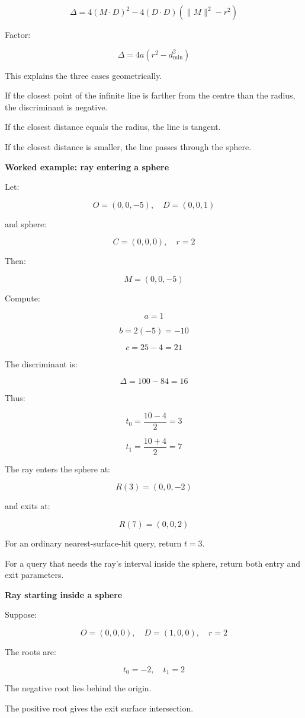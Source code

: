 \[
\Delta= 4(M\cdot D)^2 - 4(D\cdot D)(\|M\|^2-r^2)
\]

Factor:

\[
\boxed{ \Delta=4a(r^2-d_{\min}^2) }
\]

This explains the three cases geometrically.

If the closest point of the infinite line is farther from the centre than the radius, the discriminant is negative.

If the closest distance equals the radius, the line is tangent.

If the closest distance is smaller, the line passes through the sphere.

\textbf{Worked example: ray entering a sphere}

Let:

\[
O=(0,0,-5),\quad D=(0,0,1)
\]

and sphere:

\[
C=(0,0,0),\quad r=2
\]

Then:

\[
M=(0,0,-5)
\]

Compute:

\[
a=1
\]

\[
b=2(-5)=-10
\]

\[
c=25-4=21
\]

The discriminant is:

\[
\Delta=100-84=16
\]

Thus:

\[
t_0=\frac{10-4}{2}=3
\]

\[
t_1=\frac{10+4}{2}=7
\]

The ray enters the sphere at:

\[
R(3)=(0,0,-2)
\]

and exits at:

\[
R(7)=(0,0,2)
\]

For an ordinary nearest-surface-hit query, return \(t=3\).

For a query that needs the ray's interval inside the sphere, return both entry and exit parameters.

\textbf{Ray starting inside a sphere}

Suppose:

\[
O=(0,0,0),\quad D=(1,0,0),\quad r=2
\]

The roots are:

\[
t_0=-2,\quad t_1=2
\]

The negative root lies behind the origin.

The positive root gives the exit surface intersection.

